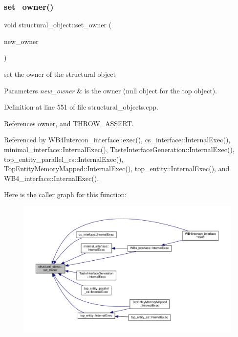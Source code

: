 \subsubsection{\texorpdfstring{set\+\_\+owner()}{set\_owner()}}
{\footnotesize\ttfamily void structural\+\_\+object\+::set\+\_\+owner (\begin{DoxyParamCaption}\item[{const \hyperlink{structural__objects_8hpp_a8ea5f8cc50ab8f4c31e2751074ff60b2}{structural\+\_\+object\+Ref}}]{new\+\_\+owner }\end{DoxyParamCaption})}



set the owner of the structural object 


\begin{DoxyParams}{Parameters}
{\em new\+\_\+owner} & is the owner (null object for the top object). \\
\hline
\end{DoxyParams}


Definition at line 551 of file structural\+\_\+objects.\+cpp.



References owner, and T\+H\+R\+O\+W\+\_\+\+A\+S\+S\+E\+RT.



Referenced by W\+B4\+Intercon\+\_\+interface\+::exec(), cs\+\_\+interface\+::\+Internal\+Exec(), minimal\+\_\+interface\+::\+Internal\+Exec(), Taste\+Interface\+Generation\+::\+Internal\+Exec(), top\+\_\+entity\+\_\+parallel\+\_\+cs\+::\+Internal\+Exec(), Top\+Entity\+Memory\+Mapped\+::\+Internal\+Exec(), top\+\_\+entity\+::\+Internal\+Exec(), and W\+B4\+\_\+interface\+::\+Internal\+Exec().

Here is the caller graph for this function\+:
\nopagebreak
\begin{figure}[H]
\begin{center}
\leavevmode
\includegraphics[width=350pt]{d8/da3/classstructural__object_a6baefd335d65ccf273b2bf3cf660cd90_icgraph}
\end{center}
\end{figure}
\mbox{\label{classstructural__object_a93d2151908044a34a703473b254a2fc5}} 
